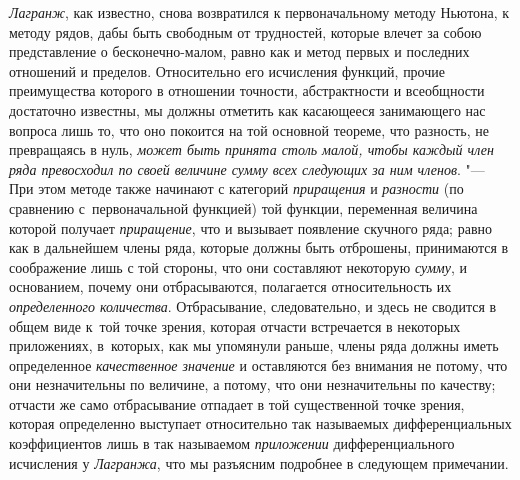 {\em Лагранж}, как известно, снова возвратился к первоначальному методу
Ньютона, к методу рядов, дабы быть свободным от трудностей, которые влечет за
собою представление о бесконечно-малом, равно как и метод первых и последних
отношений и пределов. Относительно его исчисления функций, прочие преимущества
которого в отношении точности, абстрактности и всеобщности достаточно известны,
мы должны отметить как касающееся занимающего нас вопроса лишь то, что оно
покоится на той основной теореме, что разность, не превращаясь в нуль,
{\em может быть принята столь малой, чтобы каждый член ряда превосходил по
своей величине сумму всех следующих за ним членов}. "--- При этом методе также
начинают с категорий {\em приращения} и {\em разности} (по сравнению
с~первоначальной функцией) той функции, переменная величина которой получает
{\em приращение}, что и вызывает появление скучного ряда; равно как в
дальнейшем члены ряда, которые должны быть отброшены, принимаются в соображение
лишь с той стороны, что они составляют некоторую {\em сумму}, и основанием,
почему они отбрасываются, полагается относительность их {\em определенного
количества}. Отбрасывание, следовательно, и здесь не сводится в общем виде
к~той точке зрения, которая отчасти встречается в некоторых приложениях,
в~которых, как мы упомянули раньше, члены ряда должны иметь определенное
{\em качественное значение} и оставляются без внимания не потому, что они
незначительны по величине, а потому, что они незначительны по качеству;
отчасти же само отбрасывание отпадает в той существенной точке зрения,
которая определенно выступает относительно так называемых дифференциальных
коэффициентов лишь в так называемом {\em приложении} дифференциального
исчисления у {\em Лагранжа}, что мы разъясним подробнее в следующем примечании.

